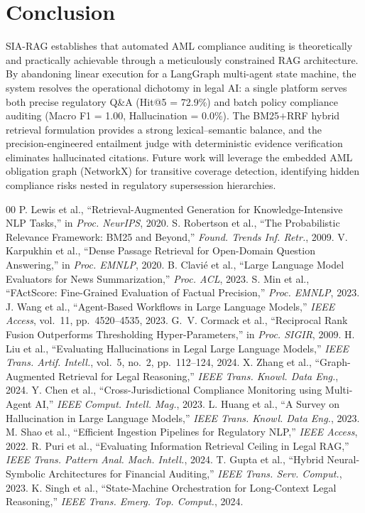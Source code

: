 \documentclass[conference, a4paper]{IEEEtran}
\begin{document}
\section{Conclusion}

SIA-RAG establishes that automated AML compliance auditing is theoretically and practically
achievable through a meticulously constrained RAG architecture. By abandoning linear execution for
a LangGraph multi-agent state machine, the system resolves the operational dichotomy in legal AI:
a single platform serves both precise regulatory Q\&A (Hit@5 = 72.9\%) and batch policy
compliance auditing (Macro F1 = 1.00, Hallucination = 0.0\%). The BM25$+$RRF hybrid retrieval
formulation provides a strong lexical--semantic balance, and the precision-engineered entailment
judge with deterministic evidence verification eliminates hallucinated citations. Future work will
leverage the embedded AML obligation graph (NetworkX) for transitive coverage detection,
identifying hidden compliance risks nested in regulatory supersession hierarchies.

\begin{thebibliography}{00}
 P. Lewis et al., ``Retrieval-Augmented Generation for Knowledge-Intensive NLP Tasks,''
in \textit{Proc. NeurIPS}, 2020.
 S. Robertson et al., ``The Probabilistic Relevance Framework: BM25 and Beyond,''
\textit{Found. Trends Inf. Retr.}, 2009.
 V. Karpukhin et al., ``Dense Passage Retrieval for Open-Domain Question Answering,''
in \textit{Proc. EMNLP}, 2020.
 B. Clavi{\'e} et al., ``Large Language Model Evaluators for News Summarization,''
\textit{Proc. ACL}, 2023.
 S. Min et al., ``FActScore: Fine-Grained Evaluation of Factual Precision,''
\textit{Proc. EMNLP}, 2023.
 J. Wang et al., ``Agent-Based Workflows in Large Language Models,''
\textit{IEEE Access}, vol.~11, pp.~4520--4535, 2023.
 G.~V. Cormack et al., ``Reciprocal Rank Fusion Outperforms Thresholding Hyper-Parameters,''
in \textit{Proc. SIGIR}, 2009.
 H. Liu et al., ``Evaluating Hallucinations in Legal Large Language Models,''
\textit{IEEE Trans. Artif. Intell.}, vol.~5, no.~2, pp.~112--124, 2024.
 X. Zhang et al., ``Graph-Augmented Retrieval for Legal Reasoning,''
\textit{IEEE Trans. Knowl. Data Eng.}, 2024.
 Y. Chen et al., ``Cross-Jurisdictional Compliance Monitoring using Multi-Agent AI,''
\textit{IEEE Comput. Intell. Mag.}, 2023.
 L. Huang et al., ``A Survey on Hallucination in Large Language Models,''
\textit{IEEE Trans. Knowl. Data Eng.}, 2023.
 M. Shao et al., ``Efficient Ingestion Pipelines for Regulatory NLP,''
\textit{IEEE Access}, 2022.
 R. Puri et al., ``Evaluating Information Retrieval Ceiling in Legal RAG,''
\textit{IEEE Trans. Pattern Anal. Mach. Intell.}, 2024.
 T. Gupta et al., ``Hybrid Neural-Symbolic Architectures for Financial Auditing,''
\textit{IEEE Trans. Serv. Comput.}, 2023.
 K. Singh et al., ``State-Machine Orchestration for Long-Context Legal Reasoning,''
\textit{IEEE Trans. Emerg. Top. Comput.}, 2024.
\end{thebibliography}
\end{document}
